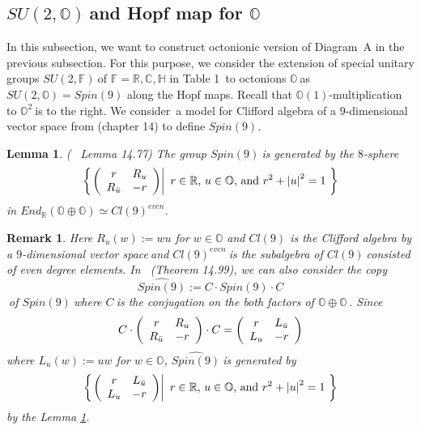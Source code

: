 \documentclass[a4paper]{article}%
\newtheorem{lemma}[theorem]{Lemma}
\newtheorem{remark}[theorem]{Remark}
\begin{document}
\bigskip

\subsection{ \label{subsectionOandGroupaction}$SU(2,\mathbb{O})\ $and Hopf map
for $\mathbb{O}$}

In this subsection, we want to construct octonionic version of Diagram\ A in
the previous subsection. For this purpose, we consider the extension of
special unitary groups $SU(2,\mathbb{F})\ $of $\mathbb{F}=\mathbb{R}%
,\mathbb{C},\mathbb{H}$ in Table 1\ to octonions $\mathbb{O\ }$as
$SU(2,\mathbb{O})=Spin(9)$ along the Hopf maps. Recall that $\mathbb{O}\left(
1\right)  $-multiplication to $\mathbb{O}^{2}\ $is to the right. We
consider\ a model for Clifford algebra of a $9$-dimensional vector space from
\cite{Har} (chapter 14) to define $Spin(9)$.

\begin{lemma}
\label{Spin9Lemma}( \cite{Har}\ Lemma 14.77) The group $Spin(9)\ $is generated
by the $8$-sphere
\[
\left\{  \left.  \left(
\begin{array}
[c]{cc}%
r & R_{u}\\
R_{\bar{u}} & -r
\end{array}
\right)  \right\vert \ r\in\mathbb{R}\text{,}\ u\in\mathbb{O}\text{, and
}r^{2}+\left\vert u\right\vert ^{2}=1\text{ }\right\}
\]
in $End_{\mathbb{R}}\left(  \mathbb{O\oplus O}\right)  \simeq Cl\left(
9\right)  ^{even}$.
\end{lemma}

\begin{remark}
Here $R_{u}\left(  w\right)  :=wu$ for $w\in\mathbb{O}$ and $Cl\left(
9\right)  $ is the Clifford algebra by a $9$-dimensional vector space$\ $and
$Cl\left(  9\right)  ^{even}\ $is the subalgebra of $Cl\left(  9\right)
\ $consisted of even degree elements. In \cite{Har}\ (Theorem 14.99), we can
also consider the copy
\[
\widehat{Spin(9)}:=C\cdot Spin(9)\cdot C
\]
$\ $of $Spin(9)\ $where $C\ $is the conjugation on the both factors of
$\mathbb{O\oplus O\,}$. Since
\[
C\cdot\left(
\begin{array}
[c]{cc}%
r & R_{u}\\
R_{\bar{u}} & -r
\end{array}
\right)  \cdot C=\left(
\begin{array}
[c]{cc}%
r & L_{\bar{u}}\\
L_{u} & -r
\end{array}
\right)
\]
where $L_{u}\left(  w\right)  :=uw$ for $w\in\mathbb{O}$, $\widehat
{Spin(9)}\ $is generated by
\[
\left\{  \left.  \left(
\begin{array}
[c]{cc}%
r & L_{\bar{u}}\\
L_{u} & -r
\end{array}
\right)  \right\vert \ r\in\mathbb{R}\text{,}\ u\in\mathbb{O}\text{, and
}r^{2}+\left\vert u\right\vert ^{2}=1\text{ }\right\}
\]
by the Lemma \ref{Spin9Lemma}.
\end{remark}
\end{document}
